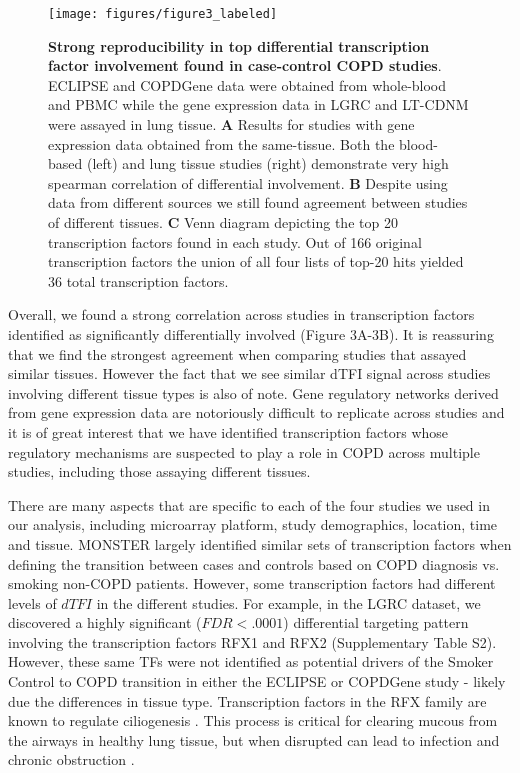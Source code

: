 \documentclass[9pt,twocolumn,twoside]{pnas-new}
\begin{document}
\begin{figure*}
\texttt{[image: figures/figure3\_labeled]}

\caption{\textbf{Strong reproducibility in top differential transcription factor
involvement found in case-control COPD studies}. ECLIPSE and COPDGene
data were obtained from whole-blood and PBMC while the gene expression
data in LGRC and LT-CDNM were assayed in lung tissue. \textbf{A} Results
for studies with gene expression data obtained from the same-tissue.
Both the blood-based (left) and lung tissue studies (right) demonstrate
very high spearman correlation of differential involvement. \textbf{B}
Despite using data from different sources we still found agreement
between studies of different tissues. \textbf{C} Venn diagram depicting
the top 20 transcription factors found in each study. Out of 166 original
transcription factors the union of all four lists of top-20 hits yielded
36 total transcription factors.}
\label{fig:compare}
\end{figure*}

Overall, we found a strong correlation across studies in transcription
factors identified as significantly differentially involved (Figure
3A-3B). It is reassuring that we find the strongest agreement when
comparing studies that assayed similar tissues. However the fact that
we see similar dTFI signal across studies involving different tissue
types is also of note. Gene regulatory networks derived from gene
expression data are notoriously difficult to replicate across studies
\cite{sirbu2010comparison} and it is of great interest that we have
identified transcription factors whose regulatory mechanisms are suspected
to play a role in COPD across multiple studies, including those assaying
different tissues.

There are many aspects that are specific to each of the four studies
we used in our analysis, including microarray platform, study demographics,
location, time and tissue. MONSTER largely identified similar sets
of transcription factors when defining the transition between cases
and controls based on COPD diagnosis vs. smoking non-COPD patients.
However, some transcription factors had different levels of $dTFI$
in the different studies. For example, in the LGRC dataset, we discovered
a highly significant ($FDR<.0001$) differential targeting pattern
involving the transcription factors RFX1 and RFX2 (Supplementary Table
S2). However, these same TFs were not identified as potential drivers
of the Smoker Control to COPD transition in either the ECLIPSE or
COPDGene study - likely due the differences in tissue type. Transcription
factors in the RFX family are known to regulate ciliogenesis \cite{choksi2014switching}.
This process is critical for clearing mucous from the airways in healthy
lung tissue, but when disrupted can lead to infection and chronic
obstruction \cite{hessel2014intraflagellar,hogg2004pathophysiology,fahy2010airway}. 
\end{document}
